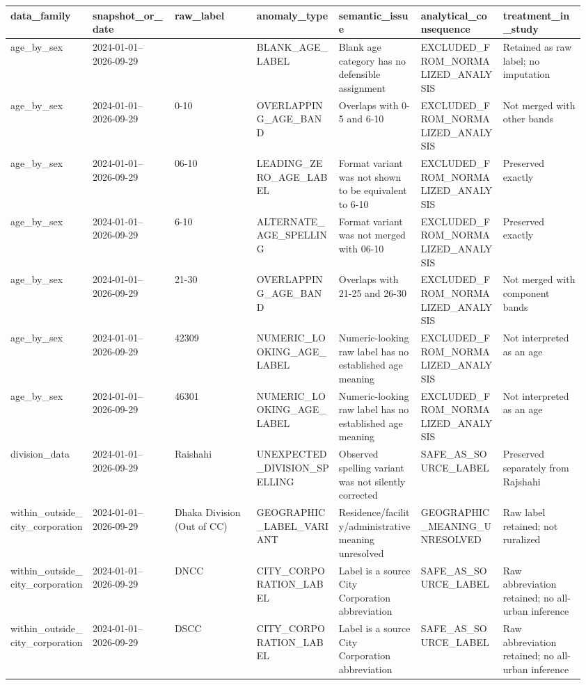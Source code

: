 \begingroup\footnotesize\setlength{\tabcolsep}{3pt}\renewcommand{\arraystretch}{1.15}
\begin{longtable}{P{0.1371\linewidth}P{0.1371\linewidth}P{0.1371\linewidth}P{0.1371\linewidth}P{0.1371\linewidth}P{0.1371\linewidth}P{0.1371\linewidth}}
\toprule
data\_family & snapshot\_or\_date & raw\_label & anomaly\_type & semantic\_issue & analytical\_consequence & treatment\_in\_study \\
\midrule\endhead
age\_by\_sex & 2024-01-01--2026-09-29 &  & BLANK\_AGE\_LABEL & Blank age category has no defensible assignment & EXCLUDED\_FROM\_NORMALIZED\_ANALYSIS & Retained as raw label; no imputation \\
age\_by\_sex & 2024-01-01--2026-09-29 & 0-10 & OVERLAPPING\_AGE\_BAND & Overlaps with 0-5 and 6-10 & EXCLUDED\_FROM\_NORMALIZED\_ANALYSIS & Not merged with other bands \\
age\_by\_sex & 2024-01-01--2026-09-29 & 06-10 & LEADING\_ZERO\_AGE\_LABEL & Format variant was not shown to be equivalent to 6-10 & EXCLUDED\_FROM\_NORMALIZED\_ANALYSIS & Preserved exactly \\
age\_by\_sex & 2024-01-01--2026-09-29 & 6-10 & ALTERNATE\_AGE\_SPELLING & Format variant was not merged with 06-10 & EXCLUDED\_FROM\_NORMALIZED\_ANALYSIS & Preserved exactly \\
age\_by\_sex & 2024-01-01--2026-09-29 & 21-30 & OVERLAPPING\_AGE\_BAND & Overlaps with 21-25 and 26-30 & EXCLUDED\_FROM\_NORMALIZED\_ANALYSIS & Not merged with component bands \\
age\_by\_sex & 2024-01-01--2026-09-29 & 42309 & NUMERIC\_LOOKING\_AGE\_LABEL & Numeric-looking raw label has no established age meaning & EXCLUDED\_FROM\_NORMALIZED\_ANALYSIS & Not interpreted as an age \\
age\_by\_sex & 2024-01-01--2026-09-29 & 46301 & NUMERIC\_LOOKING\_AGE\_LABEL & Numeric-looking raw label has no established age meaning & EXCLUDED\_FROM\_NORMALIZED\_ANALYSIS & Not interpreted as an age \\
division\_data & 2024-01-01--2026-09-29 & Raishahi & UNEXPECTED\_DIVISION\_SPELLING & Observed spelling variant was not silently corrected & SAFE\_AS\_SOURCE\_LABEL & Preserved separately from Rajshahi \\
within\_outside\_city\_corporation & 2024-01-01--2026-09-29 & Dhaka Division (Out of CC) & GEOGRAPHIC\_LABEL\_VARIANT & Residence/facility/administrative meaning unresolved & GEOGRAPHIC\_MEANING\_UNRESOLVED & Raw label retained; not ruralized \\
within\_outside\_city\_corporation & 2024-01-01--2026-09-29 & DNCC & CITY\_CORPORATION\_LABEL & Label is a source City Corporation abbreviation & SAFE\_AS\_SOURCE\_LABEL & Raw abbreviation retained; no all-urban inference \\
within\_outside\_city\_corporation & 2024-01-01--2026-09-29 & DSCC & CITY\_CORPORATION\_LABEL & Label is a source City Corporation abbreviation & SAFE\_AS\_SOURCE\_LABEL & Raw abbreviation retained; no all-urban inference \\
\bottomrule
\end{longtable}
\endgroup
